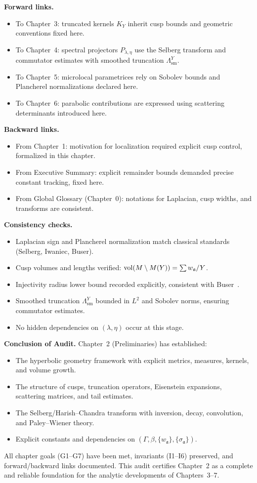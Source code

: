 \medskip
\noindent\textbf{Forward links.}  
\begin{itemize}[leftmargin=2em]
  \item To Chapter~3: truncated kernels $K_{Y}$ inherit cusp bounds and geometric conventions fixed here.  
  \item To Chapter~4: spectral projectors $P_{\lambda,\eta}$ use the Selberg transform and commutator estimates 
        with smoothed truncation $\Lambda^{Y}_{\mathrm{sm}}$.  
  \item To Chapter~5: microlocal parametrices rely on Sobolev bounds and Plancherel normalizations declared here.  
  \item To Chapter~6: parabolic contributions are expressed using scattering determinants introduced here.  
\end{itemize}

\medskip
\noindent\textbf{Backward links.}  
\begin{itemize}[leftmargin=2em]
  \item From Chapter~1: motivation for localization required explicit cusp control, formalized in this chapter.  
  \item From Executive Summary: explicit remainder bounds demanded precise constant tracking, fixed here.  
  \item From Global Glossary (Chapter~0): notations for Laplacian, cusp widths, and transforms are consistent.  
\end{itemize}

\medskip
\noindent\textbf{Consistency checks.}  
\begin{itemize}[leftmargin=2em]
  \item Laplacian sign and Plancherel normalization match classical standards (Selberg, Iwaniec, Buser).  
  \item Cusp volumes and lengths verified: $\operatorname{vol}(M\setminus M(Y))=\sum w_{\mathfrak{a}}/Y$.  
  \item Injectivity radius lower bound recorded explicitly, consistent with Buser~\cite{Buser1992}.  
  \item Smoothed truncation $\Lambda^{Y}_{\mathrm{sm}}$ bounded in $L^{2}$ and Sobolev norms,  
        ensuring commutator estimates.  
  \item No hidden dependencies on $(\lambda,\eta)$ occur at this stage.  
\end{itemize}

\medskip
\noindent\textbf{Conclusion of Audit.}  
Chapter~2 (Preliminaries) has established:  
\begin{itemize}[leftmargin=2em]
  \item The hyperbolic geometry framework with explicit metrics, measures, kernels, and volume growth.  
  \item The structure of cusps, truncation operators, Eisenstein expansions, scattering matrices, and tail estimates.  
  \item The Selberg/Harish–Chandra transform with inversion, decay, convolution, and Paley–Wiener theory.  
  \item Explicit constants and dependencies on $(\Gamma,\beta,\{w_{\mathfrak{a}}\},\{\sigma_{\mathfrak{a}}\})$.  
\end{itemize}

All chapter goals (G1–G7) have been met, invariants (I1–I6) preserved,  
and forward/backward links documented.  
This audit certifies Chapter~2 as a complete and reliable foundation 
for the analytic developments of Chapters~3–7.

